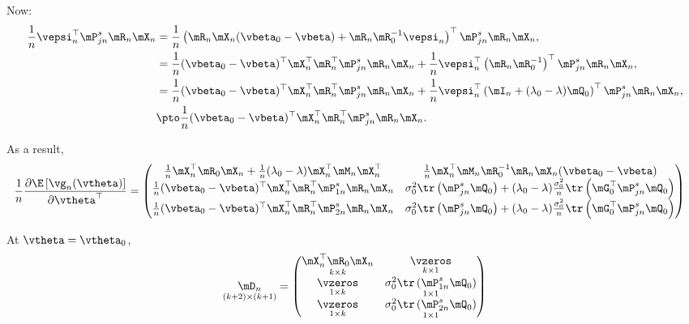 \documentclass[english,12pt]{book}\usepackage[]{graphicx}\usepackage[]{xcolor}
\begin{document}
\begin{subappendices}
Now:
\begin{equation*}
\begin{aligned}
\frac{1}{n}\vepsi_n^\top\mP_{jn}^s\mR_n\mX_n & = \frac{1}{n}\left(\mR_n\mX_n(\vbeta_0 - \vbeta) + \mR_n\mR_0^{-1}\vepsi_n\right)^\top\mP_{jn}^s\mR_n\mX_n, \\
& = \frac{1}{n}(\vbeta_0 - \vbeta)^\top\mX_n^\top\mR_n^\top\mP_{jn}^s\mR_n\mX_n + \frac{1}{n}\vepsi_n^\top\left(\mR_n\mR_0^{-1}\right)^\top\mP_{jn}^s\mR_n\mX_n, \\
& = \frac{1}{n}(\vbeta_0 - \vbeta)^\top\mX_n^\top\mR_n^\top\mP_{jn}^s\mR_n\mX_n + \frac{1}{n}\vepsi_n^\top\left(\mI_n + (\lambda_0 - \lambda)\mQ_0\right)^\top\mP_{jn}^s\mR_n\mX_n, \\
& \pto \frac{1}{n}(\vbeta_0 - \vbeta)^\top\mX_n^\top\mR_n^\top\mP_{jn}^s\mR_n\mX_n.
\end{aligned}
\end{equation*}


As a result, 
\begin{equation}
\begin{aligned}
\frac{1}{n}\frac{\partial \E\left[\vg_n(\vtheta)\right]}{\partial \vtheta^\top} & = \begin{pmatrix}
  \frac{1}{n}\mX_n^\top\mR_0\mX_n +\frac{1}{n}(\lambda_0 - \lambda)\mX^\top_n\mM_n\mX_n^\top & \frac{1}{n}\mX_n^\top\mM_n\mR_0^{-1}\mR_n\mX_n(\vbeta_0 - \vbeta) \\
  \frac{1}{n}(\vbeta_0 - \vbeta)^\top\mX_n^\top\mR_n^\top\mP_{1n}^s\mR_n\mX_n & \sigma_0^2 \tr\left(\mP_{jn}^{s}\mQ_0\right) + (\lambda_0- \lambda)\frac{\sigma_0^2}{n}\tr\left(\mG_0^\top\mP_{jn}^s\mQ_0\right) \\
  \frac{1}{n}(\vbeta_0 - \vbeta)^\top\mX_n^\top\mR_n^\top\mP_{2n}^s\mR_n\mX_n & \sigma_0^2 \tr\left(\mP_{jn}^{s}\mQ_0\right) + (\lambda_0- \lambda)\frac{\sigma_0^2}{n}\tr\left(\mG_0^\top\mP_{jn}^s\mQ_0\right)
\end{pmatrix}
\end{aligned}
\end{equation}

At $\vtheta = \vtheta_0$,
\begin{equation*}
\underset{(k + 2)\times (k + 1)}{\mD_n} = 
\begin{pmatrix}
  \underset{k\times k}{\mX_n^\top\mR_0\mX_n} & \underset{k\times 1}{\vzeros} \\
  \underset{1 \times k}{\vzeros} & \underset{1\times 1}{\sigma_0^2 \tr\left(\mP_{1n}^{s}\mQ_0\right)}\\
  \underset{1\times k}{\vzeros} & \underset{1\times 1}{\sigma_0^2 \tr\left(\mP_{2n}^{s}\mQ_0\right)}
\end{pmatrix}
\end{equation*}



\end{subappendices}
\end{document}
